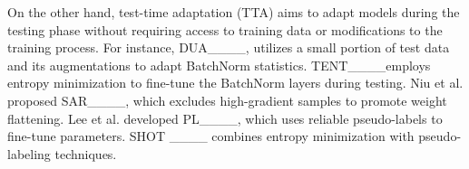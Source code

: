 On the other hand, test-time adaptation (TTA) aims to adapt models during the testing phase without requiring access to training data or modifications to the training process. For instance, DUA____, utilizes a small portion of test data and its augmentations to adapt BatchNorm statistics. TENT____employs entropy minimization to fine-tune the BatchNorm layers during testing. Niu et al. proposed SAR____, which excludes high-gradient samples to promote weight flattening. Lee et al. developed PL____, which uses reliable pseudo-labels to fine-tune parameters. SHOT ____ combines entropy minimization with pseudo-labeling techniques.


